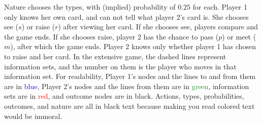 \documentclass[10pt]{article}
\begin{document}
\begin{figure}[H]
\end{figure}

Nature chooses the types, with (implied) probability of $0.25$ for each. Player 1 only knows her own card, and can not tell what player 2's card is. She chooses see ($s$) or raise ($r$) after viewing her card. If she chooses see, players compare and the game ends. If she chooses raise, player 2 has the chance to pass ($p$) or meet ($m$), after which the game ends. Player 2 knows only whether player 1 has chosen to raise and her card. In the extensive game, the dashed lines represent information sets, and the number on them is the player who moves in that information set. For readability, Player 1's nodes and the lines to and from them are in \textcolor{blue}{blue}, Player 2's nodes and the lines from them are in \textcolor{ForestGreen}{green}, information sets are in \textcolor{red}{red}, and outcome nodes are in black. Actions, types, probabilities, outcomes, and nature are all in black text because making you read colored text would be immoral. 




\newpage
\end{document}
